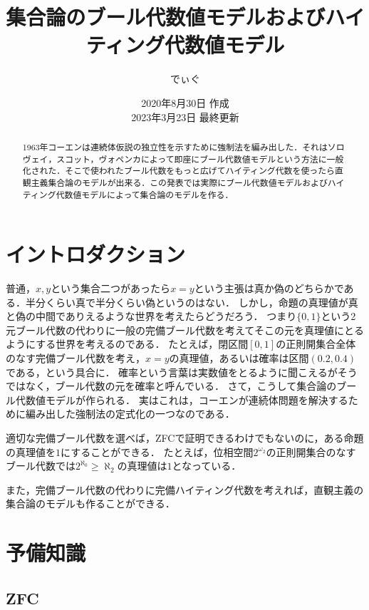 \documentclass[uplatex,dvipdfmx]{jsarticle}
\title{集合論のブール代数値モデルおよびハイティング代数値モデル}
\date{2020年8月30日 作成 \\ 2023年3月23日 最終更新}
\author{でぃぐ}
\theoremstyle{definition}
\begin{document}
\maketitle

\begin{abstract}
1963年コーエンは連続体仮説の独立性を示すために強制法を編み出した．それはソロヴェイ，スコット，ヴォペンカによって即座にブール代数値モデルという方法に一般化された．そこで使われたブール代数をもっと広げてハイティング代数を使ったら直観主義集合論のモデルが出来る．この発表では実際にブール代数値モデルおよびハイティング代数値モデルによって集合論のモデルを作る．
\end{abstract} 

\tableofcontents

\section{イントロダクション}

普通，$x, y$という集合二つがあったら$x = y$という主張は真か偽のどちらかである．半分くらい真で半分くらい偽というのはない．
しかし，命題の真理値が真と偽の中間でありえるような世界を考えたらどうだろう．
つまり$\{0, 1\}$という2元ブール代数の代わりに一般の完備ブール代数を考えてそこの元を真理値にとるようにする世界を考えるのである．
たとえば，閉区間$[0, 1]$の正則開集合全体のなす完備ブール代数を考え，$x = y$の真理値，あるいは確率は区間$(0.2, 0.4)$である，という具合に．
確率という言葉は実数値をとるように聞こえるがそうではなく，ブール代数の元を確率と呼んでいる．
さて，こうして集合論のブール代数値モデルが作られる．
実はこれは，コーエンが連続体問題を解決するために編み出した強制法の定式化の一つなのである．

適切な完備ブール代数を選べば，ZFCで証明できるわけでもないのに，ある命題の真理値を$1$にすることができる．
たとえば，位相空間$2^{\omega_2}$の正則開集合のなすブール代数では$2^{\aleph_0} \ge \aleph_2$の真理値は$1$となっている．

また，完備ブール代数の代わりに完備ハイティング代数を考えれば，直観主義の集合論のモデルも作ることができる．

\section{予備知識}

\subsection{ZFC}
\end{document}
